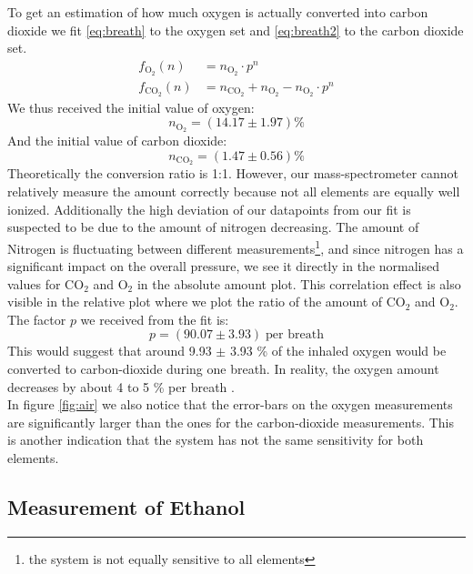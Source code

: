     
    To get an estimation of how much oxygen is actually converted into carbon dioxide we fit \eqref{eq:breath} to the oxygen set and \eqref{eq:breath2} to the carbon dioxide set.
    \begin{align}
        f_{\text{O}_2}(n) &= n_{\text{O}_2} \cdot p^n \label{eq:breath}\\
        f_{\text{CO}_2}(n) &= n_{\text{CO}_2} +  n_{\text{O}_2} - n_{\text{O}_2} \cdot p^n \label{eq:breath2}
    \end{align}
    We thus received the initial value of oxygen:
    $$ n_{\text{O}_2} = (14.17 \pm 1.97) \%$$
    And the initial value of carbon dioxide:
    $$ n_{\text{CO}_2} = (1.47 \pm 0.56) \%$$
    Theoretically the conversion ratio is 1:1. However, our mass-spectrometer cannot relatively measure the amount correctly because not all elements are equally well ionized. Additionally the high deviation of our datapoints from our fit is suspected to be due to the amount of nitrogen decreasing. The amount of Nitrogen is fluctuating between different measurements\footnote{the system is not equally sensitive to all elements}, and since nitrogen has a significant impact on the overall pressure, we see it directly in the normalised values for CO$_2$ and O$_2$ in the absolute amount plot. This correlation effect is also visible in  the relative plot where we plot the ratio of the amount of CO$_2$ and O$_2$. The factor $p$ we received from the fit is:
    $$p = (90.07 \pm 3.93) \;\text{per breath}$$
    This would suggest that around 9.93 $\pm$ 3.93 \% of the inhaled oxygen would be converted to carbon-dioxide during one breath.
    In reality, the oxygen amount decreases by about 4 to 5 \% per breath \cite{breath}.\\
    In figure \ref{fig:air} we also notice that the error-bars on the oxygen measurements are significantly larger than the ones for the carbon-dioxide measurements. This is another indication that the system has not the same sensitivity for both elements.
    
    
    \subsection{Measurement of Ethanol}
    
